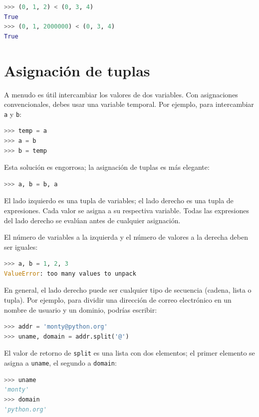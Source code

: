 \begin{lstlisting}[language=Python]
>>> (0, 1, 2) < (0, 3, 4)
True
>>> (0, 1, 2000000) < (0, 3, 4)
True
\end{lstlisting}

\section{Asignación de tuplas}

A menudo es útil intercambiar los valores de dos variables. Con asignaciones convencionales, debes usar una variable temporal. Por ejemplo, para intercambiar \texttt{a} y \texttt{b}:

\begin{lstlisting}[language=Python]
>>> temp = a
>>> a = b
>>> b = temp
\end{lstlisting}

Esta solución es engorrosa; la asignación de tuplas es más elegante:

\begin{lstlisting}[language=Python]
>>> a, b = b, a
\end{lstlisting}

El lado izquierdo es una tupla de variables; el lado derecho es una tupla de expresiones. Cada valor se asigna a su respectiva variable. Todas las expresiones del lado derecho se evalúan antes de cualquier asignación.

El número de variables a la izquierda y el número de valores a la derecha deben ser iguales:

\begin{lstlisting}[language=Python]
>>> a, b = 1, 2, 3
ValueError: too many values to unpack
\end{lstlisting}

En general, el lado derecho puede ser cualquier tipo de secuencia (cadena, lista o tupla). Por ejemplo, para dividir una dirección de correo electrónico en un nombre de usuario y un dominio, podrías escribir:

\begin{lstlisting}[language=Python]
>>> addr = 'monty@python.org'
>>> uname, domain = addr.split('@')
\end{lstlisting}

El valor de retorno de \texttt{split} es una lista con dos elementos; el primer elemento se asigna a \texttt{uname}, el segundo a \texttt{domain}:

\begin{lstlisting}[language=Python]
>>> uname
'monty'
>>> domain
'python.org'
\end{lstlisting}

